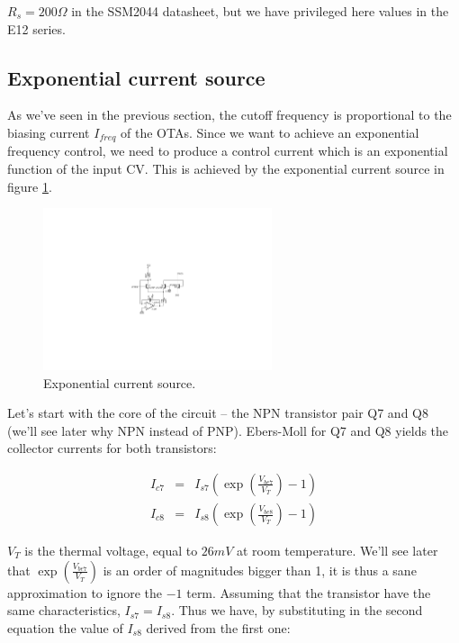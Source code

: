 \documentclass[a4paper,11pt]{article}
\begin{document}
$R_s = 200 \Omega$ in the SSM2044 datasheet, but we have privileged here values in the E12 series.

\subsection{Exponential current source}

As we've seen in the previous section, the cutoff frequency is proportional to the biasing current $I_{freq}$ of the OTAs. Since we want to achieve an exponential frequency control, we need to produce a control current which is an exponential function of the input CV. This is achieved by the exponential current source in figure \ref{fig:expo}.

\begin{figure}
\centering
\includegraphics[width=0.6\textwidth]{smr4_expo_current_source.pdf}
\caption{Exponential current source.}
\label{fig:expo}
\end{figure}

Let's start with the core of the circuit -- the NPN transistor pair Q7 and Q8 (we'll see later why NPN instead of PNP). Ebers-Moll for Q7 and Q8 yields the collector currents for both transistors:

\begin{eqnarray}
I_{c7} &=& I_{s7} \left(\exp \left( \frac{V_{be7}}{V_T} \right) - 1 \right) \\
I_{c8} &=& I_{s8} \left(\exp \left( \frac{V_{be8}}{V_T} \right) - 1 \right)
\end{eqnarray}

$V_T$ is the thermal voltage, equal to $26 mV$ at room temperature. We'll see later that $\exp \left( \frac{V_{be7}}{V_T} \right)$ is an order of magnitudes bigger than 1, it is thus a sane approximation to ignore the $- 1$ term. Assuming that the transistor have the same characteristics, $I_{s7} = I_{s8}$. Thus we have, by substituting in the second equation the value of $I_{s8}$ derived from the first one:
\end{document}
